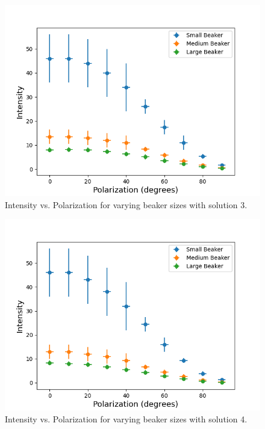 \begin{figure}[H]
    \begin{center}
        \includegraphics[width=\columnwidth]{../figures/solution3.png}
    \end{center}
    \caption{Intensity vs. Polarization for varying beaker sizes with solution 3.}
    \label{fig:solution3}
\end{figure}

\begin{figure}[H]
    \begin{center}
        \includegraphics[width=\columnwidth]{../figures/solution4.png}
    \end{center}
    \caption{Intensity vs. Polarization for varying beaker sizes with solution 4.}
    \label{fig:solution4}
\end{figure}

